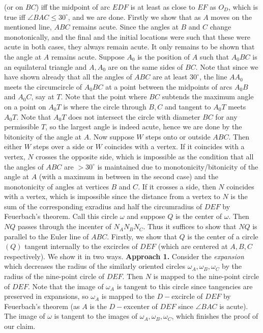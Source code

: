(or on $BC$) iff the midpoint of arc $EDF$ is at least as close to $EF$ as $O_D$, which  is true iff $\angle BAC \le 30^\circ$, and we are done. Firstly we show that as $A$ moves on the mentioned line, $ABC$ remains acute. Since the angles at $B$ and $C$ change monotonically, and the final and the initial locations were such that these were acute in both cases, they always remain acute. It only remains to be shown that the angle at $A$ remains acute. Suppose $A_0$ is the position of $A$ such that $A_0BC$ is an equilateral triangle and $A, A_0$ are on the same sides of $BC$. Note that since we have shown already that all the angles of $ABC$ are at least $30^\circ$, the line $AA_0$ meets the circumcircle of $A_0BC$ at a point between the midpoints of arcs $A_0B$ and $A_0C$, say at $T$. Note that the point where $BC$ subtends the maximum angle on a point on $A_0T$ is where the circle through $B, C$ and tangent to $A_0T$ meets $A_0T$. Note that $A_0T$ does not intersect the circle with diameter $BC$ for any permissible $T$, so the largest angle is indeed acute, hence we are done by the bitonicity of the angle at $A$. Now suppose $W$ steps onto or outside $ABC$. Then either $W$ steps over a side or $W$ coincides with a vertex. If it coincides with a vertex, $N$ crosses the opposite side, which is impossible as the condition that all the angles of $ABC$ are $> 30^\circ$ is maintained due to monotonicity/bitonicity of the angle at $A$ (with a maximum in between in the second case) and the monotonicity of angles at vertices $B$ and $C$. If it crosses a side, then $N$ coincides with a vertex, which is impossible since the distance from a vertex to $N$ is the sum of the corresponding exradius and half the circumradius of $DEF$ by Feuerbach's theorem.\nl
Call this circle $\omega$ and suppose $Q$ is the center of $\omega$. Then $NQ$ passes through the incenter of $N_AN_BN_C$. Thus it suffices to show that $NQ$ is parallel to the Euler line of $ABC$. Firstly, we show that $Q$ is the center of a circle $(Q)$ tangent internally to the excircles of $DEF$ (which are centered at $A, B, C$ respectively). We show it in two ways.\nl
\textbf{Approach 1.} Consider the \emph{expansion} which decreases the radius of the similarly oriented circles $\omega_A, \omega_B, \omega_C$ by the radius of the nine-point circle of $DEF$. Then $N$ is mapped to the nine-point circle of $DEF$. Note that the image of $\omega_A$ is tangent to this circle since tangencies are preserved in expansions, so $\omega_A$ is mapped to the $D-$excircle of $DEF$ by Feuerbach's theorem (as $A$ is the $D-$excenter of $DEF$ since $\angle BAC$ is acute). The image of $\omega$ is tangent to the images of $\omega_A, \omega_B, \omega_C$, which finishes the proof of our claim.\nl
